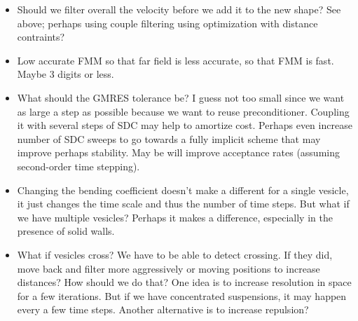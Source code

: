 \begin{itemize}
  \item Should we filter overall the velocity before we add it to the
  new shape? See above; perhaps using couple filtering using
  optimization with distance contraints?

  \item Low accurate FMM so that far field is less accurate, so that FMM
  is fast. Maybe 3 digits or less. 

  \item What should the GMRES tolerance be? I guess not too small since
  we want as large a step as possible because we want to reuse
  preconditioner. Coupling it with several steps of SDC may help to
  amortize cost. Perhaps even increase number of SDC sweeps to go
  towards a fully implicit scheme that may improve perhaps stability.
  May be will improve acceptance rates (assuming second-order time
  stepping).

  \item Changing the bending coefficient doesn't make a different for a
  single vesicle, it just changes the time scale and thus the number of
  time steps. But what  if we have multiple vesicles?  Perhaps it makes
  a difference, especially in the presence of solid walls. 

  \item What if vesicles cross? We have to be able to detect crossing.
  If they did, move back and filter more aggressively or moving
  positions to increase distances? How should we do that? One idea is to
  increase resolution in space for a few iterations. But if we have
  concentrated suspensions, it may happen every a few time steps.
  Another alternative is to increase repulsion?


\end{itemize}
